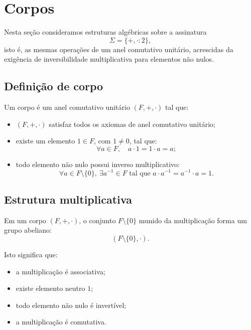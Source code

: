 \documentclass[../../main]{subfiles}
\begin{document}
\section{Corpos}
\label{sec:matematica:algebra:estruturas-algebricas:corpos}

Nesta seção consideramos estruturas algébricas sobre a assinatura
\[
	\Sigma = \{+, \cdot : 2\},
\]
isto é, as mesmas operações de um anel comutativo unitário, acrescidas da exigência de inversibilidade multiplicativa para elementos não nulos.

\subsection{Definição de corpo}

Um corpo é um anel comutativo unitário $(F,+,\cdot)$ tal que:

\begin{itemize}
	\item $(F,+,\cdot)$ satisfaz todos os axiomas de anel comutativo unitário;

	\item existe um elemento $1 \in F$, com $1 \neq 0$, tal que:
	      \[
		      \forall a \in F,\quad a \cdot 1 = 1 \cdot a = a;
	      \]

	\item todo elemento não nulo possui inverso multiplicativo:
	      \[
		      \forall a \in F \setminus \{0\},\ \exists a^{-1} \in F \text{ tal que }
		      a \cdot a^{-1} = a^{-1} \cdot a = 1.
	      \]
\end{itemize}

\subsection{Estrutura multiplicativa}

Em um corpo $(F,+,\cdot)$, o conjunto $F \setminus \{0\}$ munido da multiplicação forma um grupo abeliano:
\[
	(F \setminus \{0\}, \cdot).
\]

Isto significa que:

\begin{itemize}
	\item a multiplicação é associativa;
	\item existe elemento neutro $1$;
	\item todo elemento não nulo é invertível;
	\item a multiplicação é comutativa.
\end{itemize}
\end{document}
